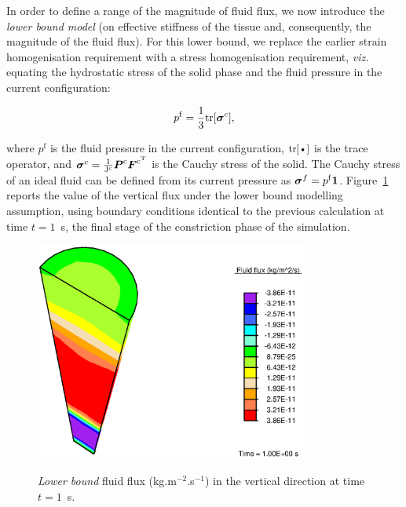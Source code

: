 In order to define a range of the magnitude of fluid flux, we now
introduce the {\em lower bound model} (on effective stiffness of the
tissue and, consequently, the magnitude of the fluid flux). For this lower bound, we
replace the earlier strain homogenisation requirement with a stress
homogenisation requirement, {\em viz.} equating the hydrostatic stress
of the solid phase and the fluid pressure in the current
configuration:

\begin{equation}
p^{\mathrm{f}}=\frac{1}{3} \mathrm{\small{tr}}[\mbox{\boldmath$\sigma$}^{c}],
\label{equalpr}
\end{equation}

\noindent where $p^{\mathrm{f}}$ is the fluid pressure in the current
configuration, $\mbox{\small{tr}[\textbullet]}$ is the trace operator, and
$\mbox{\boldmath$\sigma$}^{c}=\frac{1}{\mathrm{J^{c}}} \mbox{\boldmath$ P$}^{\mathrm{c}}
\mbox{\boldmath$ F$}^{\mathrm{c}^{\mathrm{T}}}$ is the Cauchy stress of the solid. The
Cauchy stress of an ideal fluid can be defined from its current
pressure as \mbox{$\mbox{\boldmath$\sigma$}^{f}= p^{\mathrm{f}} {\bf 1}$.}
Figure~{\ref{lowerbound}} reports the value of the vertical flux under
the lower bound modelling assumption, using boundary conditions identical to the
previous calculation at time $t=1$~s, the final stage of the
constriction phase of the simulation. 


\begin{figure}[!hpt]
  \centering
      {\includegraphics[width=0.8\textwidth]{images/examples/lagrangian/constriction/lower-bound-flux}}
      \caption{{\em Lower bound} fluid flux (kg.m$^{-2}$.s$^{-1}$) in
        the vertical direction at time $t=1$~s.}
      \label{lowerbound}
\end{figure}

